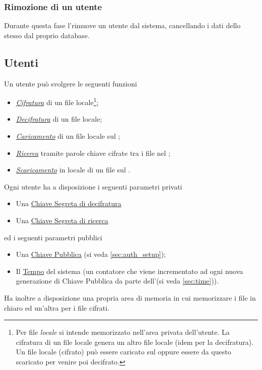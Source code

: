 \documentclass[a4paper,twoside,10pt,openany]{scrbook}
\begin{document}
\subsubsection{Rimozione di un utente}\label{sec:auth_deleteuser}
Durante questa fase l'\auth rimuove un utente dal sistema, cancellando i dati dello stesso dal proprio database.\\
%
\subsection{Utenti}\label{sec:funzionalita_utente}
Un utente può svolgere le seguenti funzioni
\begin{itemize}
 \item \hyperref[sec:user_enc]{\emph{Cifratura}} di un file locale\footnote{Per file \textit{locale} si intende memorizzato nell'area privata dell'utente. La cifratura di un file locale genera un altro file locale (idem per la decifratura). Un file locale (cifrato) può essere caricato sul \sa oppure essere da questo scaricato per venire poi decifrato.};
 \item \hyperref[sec:user_dec]{\emph{Decifratura}} di un file locale;
 \item \hyperref[sec:user_upload]{\emph{Caricamento}} di un file locale sul \sa;
 \item \hyperref[sec:user_search]{\emph{Ricerca}} tramite parole chiave cifrate tra i file nel \sa;
 \item \hyperref[sec:user_download]{\emph{Scaricamento}} in locale di un file sul \sa.
\end{itemize}
Ogni utente ha a disposizione i seguenti parametri privati
\begin{itemize}
 \item Una \hyperref[sec:sk]{Chiave Segreta di decifratura}
 \item Una \hyperref[sec:searchk]{Chiave Segreta di ricerca}
\end{itemize}
ed i seguenti parametri pubblici 
\begin{itemize}
 \item Una \hyperref[sec:pk]{Chiave Pubblica} (si veda \ref{sec:auth_setup});
 \item Il \hyperref[sec:time]{Tempo} del sistema (un contatore che viene incrementato ad ogni nuova generazione di Chiave Pubblica da parte dell'\auth (si veda \ref{sec:time})).
\end{itemize}
Ha inoltre a disposizione una propria area di memoria in cui memorizzare i file in chiaro ed un'altra per i file cifrati.
%
\end{document}
